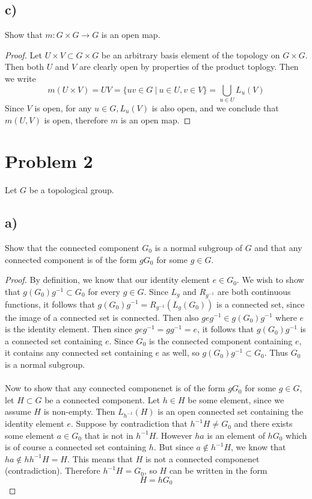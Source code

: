 \documentclass{article}
\theoremstyle{definition}
\begin{document}
\subsection*{c)}
\begin{mdframed}[]
    Show that $m:G \times G \rightarrow G$ is an open map.
\end{mdframed}
\begin{proof}
    Let $U \times V \subset G \times G$ be an arbitrary basis element of the topology on $G \times G$.
    Then both $U$ and $V$ are clearly open by properties of the product toplogy. Then we write 
    \[
        m(U \times V) = UV = \{uv \in G \ | \ u \in U, v \in V\} = \bigcup_{u \in U} L_u(V)
    \]
    Since $V$ is open, for any $u \in G, L_u(V)$ is also open, and we conclude that $m(U, V)$ is open, therefore $m$ is an open map.
\end{proof}
\section*{Problem 2}
Let $G$ be a topological group.
\subsection*{a)}
\begin{mdframed}[]
    Show that the connected component $G_0$ is a normal subgroup of $G$ and that any connected component is of the form $gG_0$ for some $g \in G$.
\end{mdframed}
\begin{proof}
    By definition, we know that our identity element $e \in G_0$. We wish to show that $g(G_0)g^{-1} \subset G_0$ for every $g \in G$.
    Since $L_g$ and $R_{g^{-1}}$ are both continuous functions, it follows that $g(G_0)g^{-1} = R_{g^{-1}}(L_g(G_0))$ is a connected set,
    since the image of a connected set is connected. Then also $geg^{-1} \in g(G_0)g^{-1}$ where $e$ is the identity element.
    Then since $geg^{-1} = gg^{-1} = e$, it follows that $g(G_0)g^{-1}$ is a connected set containing $e$. Since $G_0$ is 
    the connected component containing $e$, it contains any connected set containing $e$ as well, so $g(G_0)g^{-1} \subset G_0$. Thus
    $G_0$ is a normal subgroup.\\\\
    Now to show that any connected componenet is of the form $gG_0$ for some $g \in G$, let $H \subset G$ be a connected component.
    Let $h \in H$ be some element, since we assume $H$ is non-empty. Then $L_{h^{-1}}(H)$ is an open connected set containing the identity
    element $e$. Suppose by contradiction that $h^{-1}H \neq G_0$ and there exists some element $a \in G_0$ that is not in $h^{-1}H$.
    However $ha$ is an element of $hG_0$ which is of course a connected set containing $h$. But since $a \notin h^{-1}H$,
    we know that $ha \notin hh^{-1}H = H$. This means that $H$ is not a connected componenet (contradiction). Therefore $h^{-1}H = G_0$,
    so $H$ can be written in the form
    \[
        H = hG_0
    \]
\end{proof}
\end{document}
